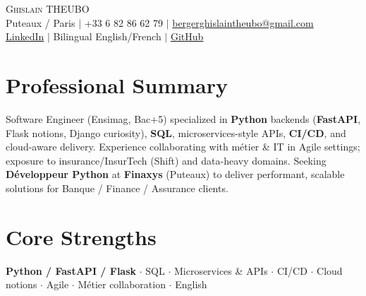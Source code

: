 \documentclass[letterpaper,10.5pt]{article}
\begin{document}
\begin{center}
{\Huge \scshape Ghislain THEUBO} \\ \vspace{2pt}
\small Puteaux / Paris $|$ +33 6 82 86 62 79 $|$ \href{mailto:bergerghislaintheubo@gmail.com}{bergerghislaintheubo@gmail.com} \\
\href{https://www.linkedin.com/in/berger-ghislain}{LinkedIn} $|$ Bilingual English/French $|$ \href{https://github.com/Bergerghislain}{GitHub}
\end{center}
\vspace{-6pt}
\section{Professional Summary}
\small{Software Engineer (Ensimag, Bac+5) specialized in \textbf{Python} backends (\textbf{FastAPI}, Flask notions, Django curiosity), \textbf{SQL}, microservices-style APIs, \textbf{CI/CD}, and cloud-aware delivery. Experience collaborating with m\'etier \& IT in Agile settings; exposure to insurance/InsurTech (Shift) and data-heavy domains. Seeking \textbf{D\'eveloppeur Python} at \textbf{Finaxys} (Puteaux) to deliver performant, scalable solutions for Banque / Finance / Assurance clients.}
\section{Core Strengths}
\small{\textbf{Python / FastAPI / Flask} $\cdot$ SQL $\cdot$ Microservices \& APIs $\cdot$ CI/CD $\cdot$ Cloud notions $\cdot$ Agile $\cdot$ M\'etier collaboration $\cdot$ English}
\end{document}
